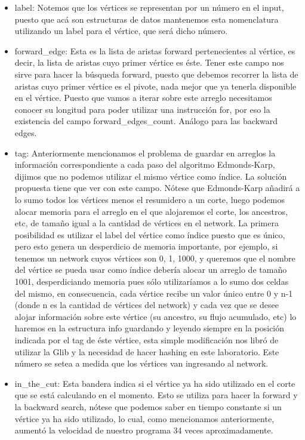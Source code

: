 \documentclass[11pt]{article}
\begin{document}
\begin{itemize}
\item label: Notemos que los vértices se representan por un número en el
  input, puesto que acá son estructuras de datos mantenemos
  esta nomenclatura utilizando un label para el vértice, que será
  dicho número.
\item forward\_edge: Esta es la lista de aristas forward pertenecientes al
  vértice, es decir, la lista de aristas cuyo primer vértice es éste.
  Tener este campo nos sirve para hacer la búsqueda forward, puesto
  que debemos recorrer la lista de aristas cuyo primer vértice es el
  pivote, nada mejor que ya tenerla disponible en el vértice. Puesto
  que vamos a iterar sobre este arreglo necesitamos conocer su
  longitud para poder utilizar una instrucción for, por eso la
  existencia del campo forward\_edges\_count. Análogo para las
  backward edges.
\item tag: Anteriormente mencionamos el problema de guardar en arreglos la
  información correspondiente a cada paso del algoritmo Edmonds-Karp,
  dijimos que no podemos utilizar el mismo vértice como índice. La
  solución propuesta tiene que ver con este campo. Nótese que
  Edmonds-Karp añadirá a lo sumo todos los vértices menos el
  resumidero a un corte, luego podemos alocar memoria para el arreglo
  en el que alojaremos el corte, los ancestros, etc, de tamaño igual
  a la cantidad de vértices en el network. La primera posibilidad es
  utilizar el label del vértice como índice puesto que es único, pero
  esto genera un desperdicio de memoria importante, por ejemplo, si
  tenemos un network cuyos vértices son 0, 1, 1000, y queremos que el
  nombre del vértice se pueda usar como índice debería alocar un
  arreglo de tamaño 1001, desperdiciando memoria pues sólo
  utilizaríamos a lo sumo dos celdas del mismo, en consecuencia, cada
  vértice recibe un valor único entre 0 y n-1 (donde n es la cantidad
  de vértices del network) y cada vez que se desee alojar información
  sobre este vértice (su ancestro, su flujo acumulado, etc) lo
  haremos en la estructura info guardando y leyendo siempre en la
  posición indicada por el tag de éste vértice, esta simple
  modificación nos libró de utilizar la Glib y la necesidad de hacer
  hashing en este laboratorio. Este número se setea a medida que los
  vértices van ingresando al network.
\item in\_the\_cut: Esta bandera indica si el vértice ya ha sido utilizado
  en el corte que se está calculando en el momento. Esto se utiliza
  para hacer la forward y la backward search, nótese que podemos saber
  en tiempo constante si un vértice ya ha sido utilizado, lo cual,
  como mencionamos anteriormente, aumentó la velocidad de nuestro
  programa 34 veces aproximadamente.
\end{itemize}
\end{document}
